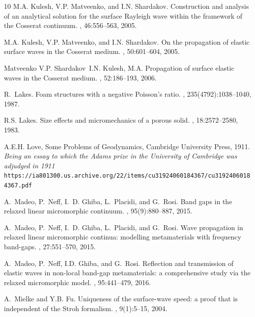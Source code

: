 \documentclass[10pt]{article}
\begin{document}
\begin{footnotesize}
\begin{thebibliography}{10}
	M.A. Kulesh, V.P. Matveenko, and I.N. Shardakov.
	\newblock Construction and analysis of an analytical solution for the surface
	{R}ayleigh wave within the framework of the {C}osserat continuum.
	, 46:556--563, 2005.
	
	M.A. Kulesh, V.P. Matveenko, and I.N. Shardakov.
	\newblock On the propagation of elastic surface waves in the  {Cosserat} medium.
	, 50:601--604, 2005.
	
	Matveenko V.P. Shardakov~I.N. Kulesh, M.A.
	\newblock Propagation of surface elastic waves in the {Cosserat} medium.
	, 52:186--193, 2006.
	
	R.~Lakes.
	\newblock Foam structures with a negative {Poisson}'s ratio.
	, 235(4792):1038--1040, 1987.
	
	R.S. Lakes.
	\newblock Size effects and micromechanics of a porous solid.
	, 18:2572--2580, 1983.
	
	
	 A.E.H.	Love, \newblock Some Problems of Geodynamics, \newblock Cambridge University Press, 1911. \textit{Being an essay to which the Adams prize in the University of Cambridge was adjudged in 1911} \texttt{{https://ia801300.us.archive.org/22/items/cu31924060184367/cu31924060184367.pdf}}
	
	A.~Madeo, P.~Neff, I.~D. Ghiba, L.~Placidi, and G.~Rosi.
	\newblock Band gaps in the relaxed linear micromorphic continuum.
	,
	95(9):880--887, 2015.
	
	A.~Madeo, P.~Neff, I.~D. Ghiba, L.~Placidi, and G.~Rosi.
	\newblock Wave propagation in relaxed linear micromorphic continua: modelling
	metamaterials with frequency band-gaps.
	, 27:551--570, 2015.
	
	A.~Madeo, P.~Neff, I.D. Ghiba, and G.~Rosi.
	\newblock Reflection and transmission of elastic waves in non-local band-gap
	metamaterials: a comprehensive study via the relaxed micromorphic model.
	, 95:441--479,
	2016.
	
	A.~Mielke and Y.B. Fu.
	\newblock Uniqueness of the surface-wave speed: a proof that is independent of
	the {S}troh formalism.
	, 9(1):5--15, 2004.
	

\end{thebibliography}
\end{footnotesize}
\end{document}
